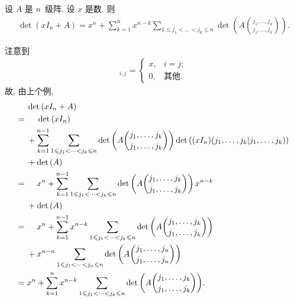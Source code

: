 \begin{example}
    设 \(A\) 是 \(n\)~级阵.
    设 \(x\) 是数.
    则
    \begin{align*}
        \det {(xI_n + A)}
        =
        x^n
        + \sum_{k = 1}^{n}
        {x^{n-k}
        \sum_{1 \leq j_1 < \dots < j_k \leq n}
        \det {\left(
            A\binom{j_1,\dots,j_k}{j_1,\dots,j_k}
            \right)}
        }.
    \end{align*}

    注意到
    \begin{align*}
        [xI_n]_{i,j}
        = \begin{cases}
              x, & i = j;     \\
              0, & \text{其他}.
          \end{cases}
    \end{align*}
    故, 由上个例,
    \begin{align*}
             &
        \det {(xI_n + A)}
        \\
        = {} &
        \hphantom{{} + {}}
        \det {(xI_n)}
        \\
             &
        + \sum_{k = 1}^{n-1}
        {
        \sum_{1 \leq j_1 < \dots < j_k \leq n}
        \det {\left(
            A\binom{j_1,\dots,j_k}{j_1,\dots,j_k}
            \right)}
        \det {((xI_n)({j_1,\dots,j_k}|{j_1,\dots,j_k}))}
        }
        \\
             &
        + \det {(A)}
        \\
        = {} &
        \hphantom{{} + {}}
        x^n
        + \sum_{k = 1}^{n-1}
        {
        \sum_{1 \leq j_1 < \dots < j_k \leq n}
        \det {\left(
            A\binom{j_1,\dots,j_k}{j_1,\dots,j_k}
            \right)}
        \,
        x^{n-k}
        }
        \\
             &
        + \det {(A)}
        \\
        = {} &
        \hphantom{{} + {}}
        x^n
        + \sum_{k = 1}^{n-1}
        {
        x^{n-k}
        \sum_{1 \leq j_1 < \dots < j_k \leq n}
        \det {\left(
            A\binom{j_1,\dots,j_k}{j_1,\dots,j_k}
            \right)}
        }
        \\
             &
        + x^{n-n}
        \sum_{1 \leq j_1 < \dots < j_n \leq n}
        \det {\left(
            A\binom{j_1,\dots,j_n}{j_1,\dots,j_n}
            \right)}
        \\
        = {} &
        x^n
        + \sum_{k = 1}^{n}
        {x^{n-k}
        \sum_{1 \leq j_1 < \dots < j_k \leq n}
        \det {\left(
            A\binom{j_1,\dots,j_k}{j_1,\dots,j_k}
            \right)}
        }.
    \end{align*}
\end{example}

